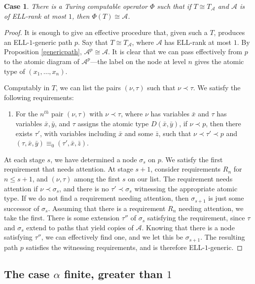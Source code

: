 \documentclass{article}
\newcommand{\ELL}{\textnormal{ELL}}
\newcounter{casecounter}
\newtheorem{case}[casecounter]{Case}
\theoremstyle{definition}
\begin{document}
	\begin{case}
		There is a Turing computable operator $\Phi$ such that if $T\cong T_\mathcal{A}$ and $\mathcal{A}$ is of \ELL-rank at most $1$, then $\Phi(T)\cong \mathcal{A}$.
	\end{case}
	\begin{proof}
		
		It is enough to give an effective procedure that, given such a $T$, produces an \ELL-$1$-generic path $p$. Say that $T\cong T_\mathcal{A}$, where $\mathcal{A}$ has \ELL-rank at most $1$. By Proposition \ref{genericpath}, $\mathcal{A}^p\cong\mathcal{A}$. It is clear that we can pass effectively from $p$ to the atomic diagram of $\mathcal{A}^p$---the label on the node at level $n$ gives the atomic type of $(x_1,\ldots,x_n)$.
		
		Computably in $T$, we can list the pairs $(\nu,\tau)$ such that $\nu\prec\tau$. We satisfy the following requirements:
		\begin{enumerate}
			\item[\textbf{$R_n$}:] For the $n^{th}$ pair $(\nu,\tau)$ with $\nu\prec\tau$, where $\nu$ has variables $\bar{x}$ and $\tau$ has variables $\bar{x},\bar{y}$, and $\tau$ assigns the atomic type $D(\bar{x},\bar{y})$, if $\nu\prec p$, then there exists $\tau'$, with variables including $\bar{x}$ and some $\bar{z}$, such that $\nu\prec\tau'\prec p$ and $(\tau,\bar{x},\bar{y})\equiv_0(\tau',\bar{x},\bar{z})$. 
		\end{enumerate} 
		
		At each stage $s$, we have determined a node $\sigma_s$ on $p$. We satisfy the first requirement that needs attention. At stage $s+1$, consider requirements $R_n$ for $n\leq s+1$, and $(\nu,\tau)$ among the first $s$ on our list. The requirement needs attention if $\nu\prec\sigma_s$, and there is no $\tau'\prec \sigma_s$ witnessing the appropriate atomic type. If we do not find a requirement needing attention, then $\sigma_{s+1}$ is just some successor of $\sigma_s$. Assuming that there is a requirement $R_n$ needing attention, we take the first. There is some extension $\tau''$ of $\sigma_s$ satisfying the requirement, since $\tau$ and $\sigma_s$ extend to paths that yield copies of $\mathcal{A}$. Knowing that there is a node satisfying $\tau''$, we can effectively find one, and we let this be $\sigma_{s+1}$. The resulting path $p$ satisfies the witnessing requirements, and is therefore \ELL-$1$-generic.
	\end{proof} 
	
	\subsection{The case $\alpha$ finite, greater than $1$} 
	
\end{document}
